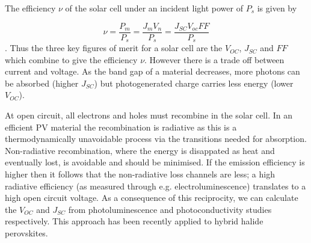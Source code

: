 The efficiency $\nu$ of the solar cell under an incident light power of $P_s$ is given by

$$\nu = \frac{P_m}{P_s} = \frac{J_m V_n}{P_s} = \frac{J_{SC} V_{oc} FF}{P_s}$$.
Thus the three key figures of merit for a solar cell are the $V_{OC}$, $J_{SC}$ and $FF$ which combine to give the efficiency $\nu$. 
However there is a trade off between current and voltage. As the band gap of a material decreases, more photons can be absorbed (higher $J_{SC}$) but photogenerated charge carries less energy (lower $V_{OC}$).

At open circuit, all electrons and holes must recombine in the solar cell. In an efficient PV material the recombination is radiative as this is a thermodynamically unavoidable process via the transitions needed for absorption. Non-radiative recombination, where the energy is disappated as heat and eventually lost, is avoidable and should be minimised. If the emission efficiency is higher then it follows that the non-radiative loss channels are less; a high radiative efficiency (as measured through e.g. electroluminescence) translates to a high open circuit voltage.\autocite{Rau2007}
As a consequence of this reciprocity, we can calculate the $V_{OC}$ and $J_{SC}$ from photoluminescence and photoconductivity studies respectively. This approach has been recently applied to hybrid halide perovskites.\autocite{Braly2018}



